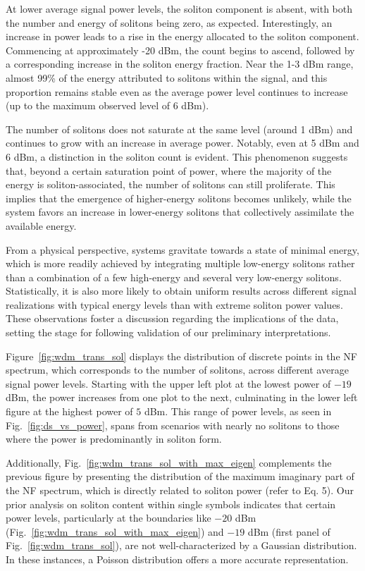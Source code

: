 At lower average signal power levels, the soliton component is absent, with both the number and energy of solitons being zero, as expected. Interestingly, an increase in power leads to a rise in the energy allocated to the soliton component. Commencing at approximately -20 dBm, the count begins to ascend, followed by a corresponding increase in the soliton energy fraction. Near the 1-3 dBm range, almost 99\% of the energy attributed to solitons within the signal, and this proportion remains stable even as the average power level continues to increase (up to the maximum observed level of 6 dBm).

The number of solitons does not saturate at the same level (around 1 dBm) and continues to grow with an increase in average power. Notably, even at 5 dBm and 6 dBm, a distinction in the soliton count is evident. This phenomenon suggests that, beyond a certain saturation point of power, where the majority of the energy is soliton-associated, the number of solitons can still proliferate. This implies that the emergence of higher-energy solitons becomes unlikely, while the system favors an increase in lower-energy solitons that collectively assimilate the available energy.

From a physical perspective, systems gravitate towards a state of minimal energy, which is more readily achieved by integrating multiple low-energy solitons rather than a combination of a few high-energy and several very low-energy solitons. Statistically, it is also more likely to obtain uniform results across different signal realizations with typical energy levels than with extreme soliton power values. These observations foster a discussion regarding the implications of the data, setting the stage for following validation of our preliminary interpretations.




Figure~\ref{fig:wdm_trans_sol} displays the distribution of discrete points in the NF spectrum, which corresponds to the number of solitons, across different average signal power levels. Starting with the upper left plot at the lowest power of \(-19\) dBm, the power increases from one plot to the next, culminating in the lower left figure at the highest power of \(5\) dBm. This range of power levels, as seen in Fig.~\ref{fig:ds_vs_power}, spans from scenarios with nearly no solitons to those where the power is predominantly in soliton form.

Additionally, Fig.~\ref{fig:wdm_trans_sol_with_max_eigen} complements the previous figure by presenting the distribution of the maximum imaginary part of the NF spectrum, which is directly related to soliton power (refer to Eq. 5). Our prior analysis on soliton content within single symbols indicates that certain power levels, particularly at the boundaries like \(-20\) dBm (Fig.~\ref{fig:wdm_trans_sol_with_max_eigen}) and \(-19\) dBm (first panel of Fig.~\ref{fig:wdm_trans_sol}), are not well-characterized by a Gaussian distribution. In these instances, a Poisson distribution offers a more accurate representation.

